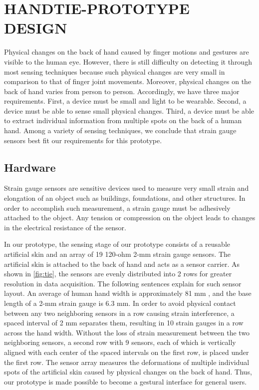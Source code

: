 \documentclass{sigchi}
\begin{document}


\section{HANDTIE-PROTOTYPE DESIGN}

Physical changes on the back of hand caused by finger motions and gestures are visible to the human eye. However, there is still difficulty on detecting it through most sensing techniques because such physical changes are very small in comparison to that of finger joint movements. Moreover, physical changes on the back of hand varies from person to person. Accordingly, we have three major requirements. First, a device must be small and light to be wearable. Second, a device must be able to sense small physical changes. Third, a device must be able to extract individual information from multiple spots on the back of a human hand. Among a variety of sensing techniques, we conclude that strain gauge sensors best fit our requirements for this prototype.

\subsection{Hardware} 
Strain gauge sensors are sensitive devices used to measure very small strain and elongation of an object such as buildings, foundations, and other structures. In order to accomplish such measurement, a strain gauge must be adhesively attached to the object. Any tension or compression on the object leads to changes in the electrical resistance of the sensor.



In our prototype, the sensing stage of our prototype consists of a reusable artificial skin and an array of 19 120-ohm 2-mm strain gauge sensors. The artificial skin is attached to the back of hand and acts as a sensor carrier. As shown in \autoref{fig:tie}, the sensors are evenly distributed into 2 rows for greater resolution in data acquisition. The following sentences explain for such sensor layout. An average of human hand width is approximately 81 mm \cite{Kulaksiz2002257}, and the base length of a 2-mm strain gauge is 6.3 mm. In order to avoid physical contact between any two neighboring sensors in a row causing strain interference, a spaced interval of 2 mm separates them, resulting in 10 strain gauges in a row across the hand width. Without the loss of strain measurement between the two neighboring sensors, a second row with 9 sensors, each of which is vertically aligned with each center of the spaced intervals on the first row, is placed under the first row. The sensor array measures the deformations of multiple individual spots of the artificial skin caused by physical changes on the back of hand. Thus, our prototype is made possible to become a gestural interface for general users.
\end{document}
